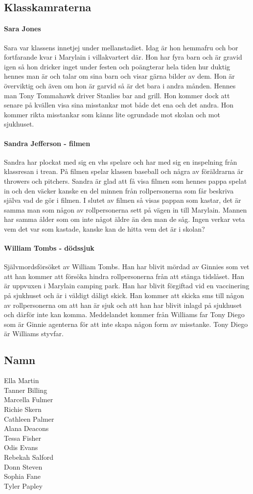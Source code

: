 \documentclass[a5paper,10pt]{report}
\begin{document}
\subsection{Klasskamraterna}
\paragraph{Sara Jones}
Sara var klassens innetjej under mellanstadiet. Idag är hon hemmafru och bor fortfarande kvar i Marylain i villakvartert där. Hon har fyra barn och är gravid igen så hon dricker inget under festen och poängterar hela tiden hur duktig hennes man är och talar om sina barn och visar gärna bilder av dem. Hon är överviktig och även om hon är garvid så är det bara i andra månden. Hennes man Tony Tommahawk driver Stanlies bar and grill. Hon kommer dock att senare på kvällen visa sina misstankar mot både det ena och det andra. Hon kommer rikta misstankar som känns lite ogrundade mot skolan och mot sjukhuset.
\paragraph{Sandra Jefferson - filmen}
Sandra har plockat med sig en vhs spelare och har med sig en inspelning från klassresan i trean. På filmen spelar klassen baseball och några av föräldrarna är throwers och pitchers. Sandra är glad att få visa filmen som hennes pappa spelat in och den väcker kanske en del minnen från rollpersonerna som får beskriva själva vad de gör i filmen. I slutet av filmen så visas pappan som kastar, det är samma man som någon av rollpersonerna sett på vägen in till Marylain. Mannen har samma ålder som om inte något äldre än den man de såg. Ingen verkar veta vem det var som kastade, kanske kan de hitta vem det är i skolan?
\paragraph{William Tombs - dödssjuk}
Självmordsförsöket av William Tombs. Han har blivit mördad av Ginnies som vet att han kommer att försöka hindra rollpersonerna från att stänga tidslåset. Han är uppvuxen i Marylain camping park. Han har blivit förgiftad vid en vaccinering på sjukhuset och är i väldigt dåligt skick. Han kommer att skicka sms till någon av rollpersonerna om att han är sjuk och att han har blivit inlagd på sjukhuset och därför inte kan komma. Meddelandet kommer från Williams far Tony Diego som är Ginnie agenterna för att inte skapa någon form av misstanke. Tony Diego är Williams styvfar.
\subsection{Namn}
Ella Martin\\
Tanner Billing\\
Marcella Fulmer\\
Richie Skern\\
Cathleen Palmer\\
Alana Deacons\\
Tessa Fisher\\
Odis Evans\\
Rebekah Salford\\
Donn Steven\\
Sophia Fane\\
Tyler Papley
\end{document}
